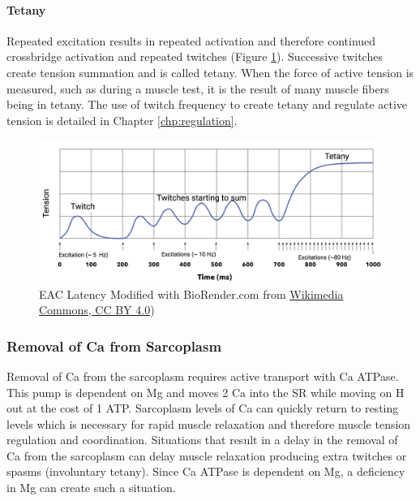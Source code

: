

\paragraph{Tetany}
Repeated excitation results in repeated activation and therefore continued crossbridge activation and repeated twitches (Figure \ref{fig:tetany}). Successive twitches create tension summation and is called tetany. When the force of active tension is measured, such as during a muscle test, it is the result of many muscle fibers being in tetany. The use of twitch frequency to create tetany and regulate active tension is detailed in Chapter \ref{chp:regulation}. 

\begin{figure}[!ht]
    \centering
    \includegraphics[width=1\linewidth]{./figure/tetany.png}
    \caption{EAC Latency \footnotesize{Modified with BioRender.com from \href{https://commons.wikimedia.org/wiki/File:Twitch_vs_unfused_tetanus_vs_fused_tetanus.png}{Wikimedia Commons, CC BY 4.0})}}
    \label{fig:tetany}
\end{figure}

\subsubsection{Removal of Ca from Sarcoplasm}
Removal of Ca from the sarcoplasm requires active transport with Ca ATPase. This pump is dependent on Mg and moves 2 Ca into the SR while moving on H out at the cost of 1 ATP. Sarcoplasm levels of Ca can quickly return to resting levels which is necessary for rapid muscle relaxation and therefore muscle tension regulation and coordination. Situations that result in a delay in the removal of Ca from the sarcoplasm can delay muscle relaxation producing extra twitches or spasms (involuntary tetany). Since Ca ATPase is dependent on Mg, a deficiency in Mg can create such a situation.

